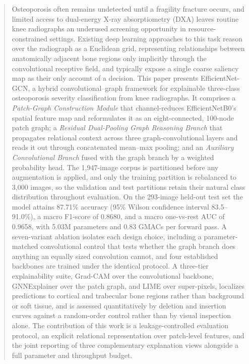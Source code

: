\documentclass[journal]{IEEEtran}
\begin{document}
\begin{abstract}
Osteoporosis often remains undetected until a fragility fracture occurs, and
limited access to dual-energy X-ray absorptiometry (DXA) leaves routine knee
radiographs an underused screening opportunity in resource-constrained
settings. Existing deep learning approaches to this task reason over the
radiograph as a Euclidean grid, representing relationships between
anatomically adjacent bone regions only implicitly through the convolutional
receptive field, and typically expose a single coarse saliency map as their
only account of a decision. This paper presents EfficientNet-GCN, a hybrid
convolutional--graph framework for explainable three-class osteoporosis
severity classification from knee radiographs. It comprises a
\emph{Patch-Graph Construction Module} that channel-reduces EfficientNetB0's
spatial feature map and reformulates it as an eight-connected, 100-node patch
graph; a \emph{Residual Dual-Pooling Graph Reasoning Branch} that propagates
relational context across three graph-convolutional layers and reads it out
through concatenated mean--max pooling; and an \emph{Auxiliary Convolutional
Branch} fused with the graph branch by a weighted probability head. The
1,947-image corpus is partitioned before any augmentation is applied, and only
the training partition is rebalanced to 3,000 images, so the validation and
test partitions retain their natural class distribution throughout evaluation.
On the 293-image held-out test set the model attains 87.71\% accuracy (95\%
Wilson confidence interval 83.5--91.0\%), a macro F1-score of 0.8680, and a
macro one-vs-rest AUC of 0.9658, with 5.03M parameters and 0.83 GMACs per
forward pass. A seven-variant ablation isolates each design choice, including a
parameter-matched convolutional control that tests whether the graph branch
does anything an equally sized convolution cannot, and four established
backbones are trained under the identical protocol. A three-tier
explainability suite, Grad-CAM over the convolutional backbone, GNNExplainer
over the patch graph, and LIME over super-pixels, localizes predictions to
cortical and trabecular bone regions rather than background or soft tissue, and
is assessed quantitatively by deletion and insertion curves against a
random-order control rather than by visual inspection alone.
The contribution of this work is a leakage-controlled evaluation protocol, an
explicit relational representation over patch-level features, and the joint
reporting of three complementary explanation views alongside a full parameter
and throughput budget.
\end{abstract}
\end{document}
